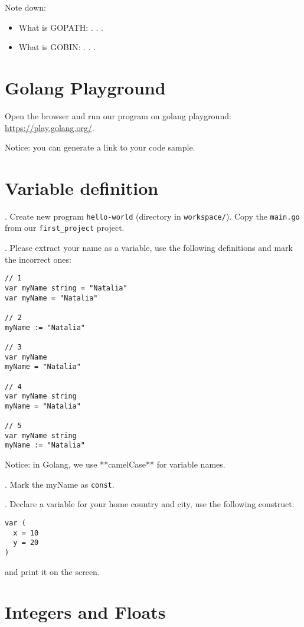 \documentclass[11pt, letterpaper]{article}
\begin{document}
\bigskip
Note down:
\begin{itemize}
    \item What is GOPATH: . . .
    \item What is GOBIN: . . .
\end{itemize}

\section{Golang Playground}

Open the browser and run our program on golang playground: \href{https://play.golang.org/}{https://play.golang.org/}.

Notice: you can generate a link to your code sample.

\section{Variable definition}
. Create new program \verb|hello-world| (directory in \texttt{workspace/}). Copy the \verb|main.go| from our \verb|first_project| project.

. Please extract your name as a variable, use the following definitions and mark the incorrect ones:

\begin{verbatim}
// 1
var myName string = "Natalia"
var myName = "Natalia"

// 2
myName := "Natalia"

// 3
var myName
myName = "Natalia"

// 4
var myName string
myName = "Natalia"

// 5
var myName string
myName := "Natalia"
\end{verbatim}

Notice: in Golang, we use **camelCase** for variable names.

. Mark the myName as \verb|const|.

. Declare a variable for your home country and city, use the following construct:

\begin{verbatim}
var (
  x = 10
  y = 20
)
\end{verbatim}

and print it on the screen.

\section{Integers and Floats}
\end{document}
